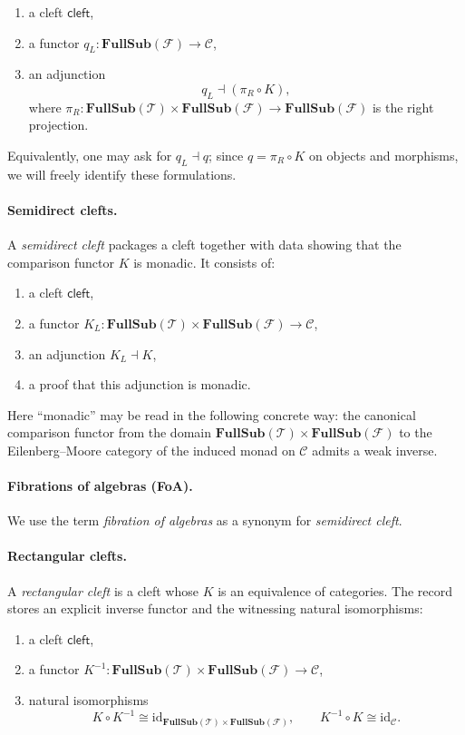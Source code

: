 \documentclass[11pt]{article}
\newcommand{\id}{\mathrm{id}}
\newcommand{\FS}[1]{\mathbf{FullSub}(#1)} %
\newcommand{\Prod}{\times}
\begin{document}
\begin{enumerate}
\item a cleft $\mathsf{cleft}$,
\item a functor $q_L : \FS{\mathcal{F}} \to \mathcal{C}$,
\item an adjunction
  \[
    q_L \dashv (\pi_R \circ K),
  \]
  where $\pi_R : \FS{\mathcal{T}}\Prod\FS{\mathcal{F}} \to \FS{\mathcal{F}}$ is the right projection.
\end{enumerate}
Equivalently, one may ask for $q_L \dashv q$; since $q = \pi_R \circ K$ on objects and morphisms,
we will freely identify these formulations.

\paragraph{Semidirect clefts.}
A \emph{semidirect cleft} packages a cleft together with data showing that the comparison functor $K$
is monadic.
It consists of:

\begin{enumerate}
\item a cleft $\mathsf{cleft}$,
\item a functor $K_L : \FS{\mathcal{T}}\Prod\FS{\mathcal{F}} \to \mathcal{C}$,
\item an adjunction $K_L \dashv K$,
\item a proof that this adjunction is monadic.
\end{enumerate}

Here ``monadic'' may be read in the following concrete way: the canonical comparison functor from
the domain $\FS{\mathcal{T}}\Prod\FS{\mathcal{F}}$ to the Eilenberg--Moore category of the induced monad on $\mathcal{C}$
admits a weak inverse.

\paragraph{Fibrations of algebras (FoA).}
We use the term \emph{fibration of algebras} as a synonym for \emph{semidirect cleft}.

\paragraph{Rectangular clefts.}
A \emph{rectangular cleft} is a cleft whose $K$ is an equivalence of categories.
The record stores an explicit inverse functor and the witnessing natural isomorphisms:

\begin{enumerate}
\item a cleft $\mathsf{cleft}$,
\item a functor $K^{-1} : \FS{\mathcal{T}}\Prod\FS{\mathcal{F}} \to \mathcal{C}$,
\item natural isomorphisms
  \[
    K \circ K^{-1} \cong \id_{\FS{\mathcal{T}}\Prod\FS{\mathcal{F}}},
    \qquad
    K^{-1} \circ K \cong \id_{\mathcal{C}}.
  \]
\end{enumerate}
\end{document}
